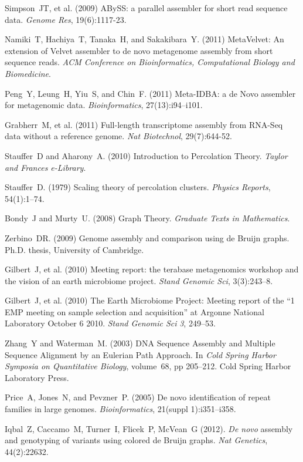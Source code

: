 \documentclass[draft]{pnastwo}
\begin{document}
\begin{article}
\begin{thebibliography}{10}
 Simpson~JT, et al. (2009) ABySS: a parallel assembler for 
short read sequence data. {\it Genome Res}, 19(6):1117-23.

 Namiki~T, Hachiya~T, Tanaka~H, and Sakakibara~Y. (2011) 
MetaVelvet: An extension of Velvet assembler to de novo metagenome assembly 
from short sequence reads. {\it ACM Conference on Bioinformatics, 
Computational Biology and Biomedicine}.

 Peng~Y, Leung~H, Yiu~S, and Chin~F. (2011) Meta-IDBA: 
a de Novo assembler for metagenomic data. {\it Bioinformatics}, 
27(13):i94--i101.

 Grabherr~M, et al. (2011) Full-length transcriptome assembly 
from RNA-Seq data without a reference genome. {\it Nat Biotechnol}, 
29(7):644-52.

 Stauffer~D and Aharony~A. (2010) Introduction to 
Percolation Theory. {\it Taylor and Frances e-Library}.

 Stauffer~D. (1979) Scaling theory of 
percolation clusters. {\it Physics Reports}, 54(1):1--74.

 Bondy~J and Murty~U. (2008) Graph Theory. {\it 
Graduate Texts in Mathematics}.

 Zerbino~DR. (2009) Genome assembly and comparison 
using de Bruijn graphs. Ph.D. thesis, University of Cambridge.

 Gilbert~J, et al. (2010) Meeting report: the terabase 
metagenomics workshop and the vision of an earth microbiome project. {\it 
Stand Genomic Sci}, 3(3):243--8.

 Gilbert~J, et al. (2010) The Earth Microbiome Project: 
Meeting report of the ``1 EMP meeting on sample selection and acquisition'' 
at Argonne National Laboratory October 6 2010. {\it Stand Genomic Sci} 
\emph{3}, 249--53.

 Zhang~Y and Waterman~M. (2003) DNA Sequence Assembly 
and Multiple Sequence Alignment by an Eulerian Path Approach. In {\it Cold 
Spring Harbor Symposia on Quantitative Biology}, volume~68, pp 205--212. 
Cold Spring Harbor Laboratory Press.

 Price~A, Jones~N, and Pevzner~P. (2005) De novo 
identification of repeat families in large genomes. {\it Bioinformatics}, 
21(suppl 1):i351--i358.

 Iqbal~Z, Caccamo~M, Turner~I, Flicek~P, McVean~G (2012).  {\it De novo} assembly and genotyping of variants using
colored de Bruijn graphs.  {\it Nat Genetics}, 44(2):22632.


\end{thebibliography}
\end{article}
\end{document}
